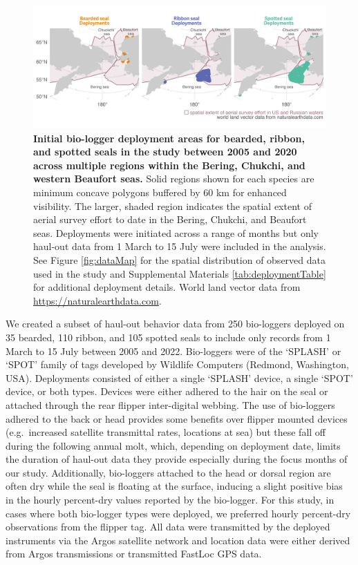 \documentclass[fleqn,10pt,lineno]{wlpeerj} %
\begin{document}
\begin{figure}
\includegraphics[width=1\linewidth]{../figures/Figure-001} \caption{\textbf{Initial bio-logger deployment areas for bearded, ribbon, and spotted seals in the study between 2005 and 2020 across multiple regions within the Bering, Chukchi, and western Beaufort seas.} \linebreak Solid regions shown for each species are minimum concave polygons buffered by 60 km for enhanced visibility. The larger, shaded region indicates the spatial extent of aerial survey effort to date in the Bering, Chukchi, and Beaufort seas. Deployments were initiated across a range of months but only haul-out data from 1 March to 15 July were included in the analysis. See Figure \ref{fig:dataMap} for the spatial distribution of observed data used in the study and Supplemental Materials \ref{tab:deploymentTable} for additional deployment details. World land vector data from \url{https://naturalearthdata.com}.}\label{fig:deployplot}
\end{figure}

We created a subset of haul-out behavior data from
250 bio-loggers deployed on
35 bearded,
110 ribbon, and
105 spotted seals
to include only records from 1 March to 15 July between
2005 and
2022. Bio-loggers were of the
`SPLASH' or `SPOT' family of tags developed by Wildlife Computers (Redmond,
Washington, USA). Deployments consisted of either a single `SPLASH' device, a
single `SPOT' device, or both types. Devices were either adhered to the hair on
the seal or attached through the rear flipper inter-digital webbing. The use of
bio-loggers adhered to the back or head provides some benefits over flipper
mounted devices (e.g.~increased satellite transmittal rates, locations at sea)
but these fall off during the following annual molt, which, depending on
deployment date, limits the duration of haul-out data they provide especially
during the focus months of our study. Additionally, bio-loggers attached to the
head or dorsal region are often dry while the seal is floating at the surface,
inducing a slight positive bias in the hourly percent-dry values reported by the
bio-logger. For this study, in cases where both bio-logger types were deployed,
we preferred hourly percent-dry observations from the flipper tag. All data were
transmitted by the deployed instruments via the Argos satellite network and
location data were either derived from Argos transmissions or transmitted
FastLoc GPS data.
\end{document}
